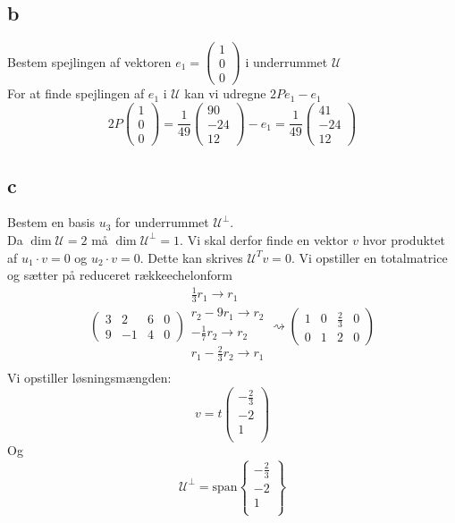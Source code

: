 \documentclass[a4paper,fleqn]{article}
\newcommand{\U}{\mathcal{U}}
\begin{document}
	\subsection{b}
	Bestem spejlingen af vektoren $e_1 = \begin{pmatrix}1\\0\\0\end{pmatrix}$ i underrummet
	$\U$\\
	For at finde spejlingen af $e_1$ i $\U$ kan vi udregne $2Pe_1 - e_1$
	\[ 2P \begin{pmatrix}1\\0\\0\end{pmatrix} = 
	\frac{1}{49}\begin{pmatrix}90\\-24\\12\end{pmatrix} - e_1
	 = \frac{1}{49}\begin{pmatrix}41\\-24\\12\end{pmatrix}
	\]

	\subsection{c}
	Bestem en basis ${u_3}$ for underrummet $\U^\perp$. \\
	Da $\dim \U = 2$ må $\dim \U^\perp = 1$. Vi skal derfor finde en vektor $v$ hvor produktet
	af $u_1 \cdot v = 0$ og $u_2 \cdot v = 0$. Dette kan skrives $\U^Tv = 0$. Vi opstiller
	en totalmatrice og sætter på reduceret rækkeechelonform
	\begin{equation*}
		\left(\begin{array}{rrr|r}
			3 & 2 & 6 & 0 \\
			9 & -1 & 4 & 0
		\end{array}\right)
		\begin{array}{l}
			\frac{1}{3}r_1 \rightarrow r_1\\
			r_2 - 9r_1 \rightarrow r_2\\
			-\frac{1}{7}r_2 \rightarrow r_2\\
			r_1 - \frac{2}{3}r_2 \rightarrow r_1\\
		\end{array} \rightsquigarrow
		\left(\begin{array}{rrrr}
			1 & 0 & \frac{2}{3} & 0 \\
			0 & 1 & 2 & 0
		\end{array}\right)
	\end{equation*}
	Vi opstiller løsningsmængden:
	\[ v = t\begin{pmatrix}
			-\frac{2}{3}\\
			-2\\
			1\\
		\end{pmatrix}
	\]
	Og 
	\[ \U^\perp = \text{span} \left\{\begin{array}{c}-\frac{2}{3}\\-2\\1\\\end{array}\right\}\]
\end{document}
